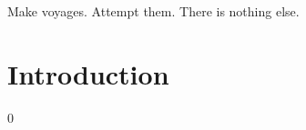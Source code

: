 \begin{savequote}[75mm]
Make voyages. Attempt them. There is nothing else.
\end{savequote}

\chapter{Introduction}
\label{introduction}0



